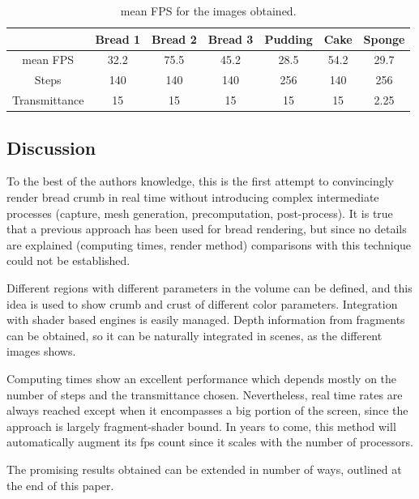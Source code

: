 \documentclass[oneside,a4paper,english,links]{amca}
\begin{document}
\begin{table}[htb]
\centering
\begin{tabular}{|c|c|c|c|c|c|c|}
\hline &  Bread 1 & Bread 2 & Bread 3 & Pudding & Cake & Sponge \\
\hline
\hline
 mean FPS  & 32.2 &  75.5 &  45.2 & 28.5 &  54.2 & 29.7\\
\hline
 Steps &  140 &  140 &  140 & 256 &  140 & 256 \\
\hline
 Transmittance &  15 &  15 &  15 & 15 &  15 & 2.25 \\
\hline
\end{tabular}
\caption{mean FPS for the images obtained. }
\label{tab:n1}
\end{table}

\subsection{Discussion}
To the best of the authors knowledge, this is the first attempt to convincingly render bread crumb in real time without introducing complex intermediate processes (capture, mesh generation, precomputation, post-process). It is true that a previous approach \citep{Cho2007} has been used for bread rendering, but since no details are explained (computing times, render method) comparisons with this technique could not be established.

Different regions with different parameters in the volume can be
defined, and this idea is used to show crumb and crust of different
color parameters. 
Integration with shader based engines is easily managed. Depth
information from fragments can be obtained, so it can be naturally
integrated in scenes, as the different images shows.

Computing times show an excellent performance which depends mostly on
the number of steps and the transmittance chosen. Nevertheless, real
time rates are always reached except when it encompasses a big portion
of the screen, since the approach is largely fragment-shader bound. In
years to come, this method will automatically augment its fps count
since it scales with the number of processors.

The promising results obtained can be extended in number of ways,
outlined at the end of this paper.


\end{document}
